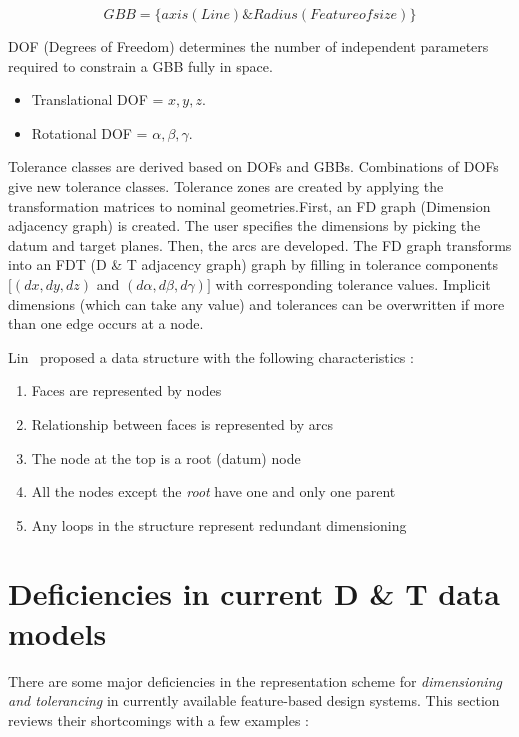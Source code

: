 			\begin{displaymath}
			GBB = \{ axis(Line) \& Radius(Feature of size) \}
			\end{displaymath}
 
    DOF (Degrees of Freedom) determines the number of independent parameters 
	required to constrain a GBB fully in space.
		\begin{itemize} 
		\item
        Translational DOF   = $ x,y,z.$
		\item
        Rotational DOF      = $\alpha,\beta,\gamma.$
		\end{itemize} 
 
    Tolerance classes are derived based on DOFs and GBBs. Combinations of DOFs 
	give new tolerance classes. Tolerance zones are created by applying the 
	transformation matrices to nominal geometries.First, an FD graph (Dimension 
	adjacency graph) is created. The user specifies the dimensions by picking 
	the datum and target planes.
    Then, the arcs are developed. The FD graph transforms into an FDT (D \& T 
	adjacency graph) graph by filling in tolerance components $ [(dx,dy,dz) $ 
	and $ (d\alpha,d\beta,d\gamma) ]$ 
	with corresponding tolerance values. Implicit dimensions (which can take 
	any value) and tolerances can be overwritten if more than one edge occurs at
	a node.
 
    Lin~\cite{Lin} proposed a data structure with the following 
	characteristics :
 
	\begin{enumerate}
	\item
    Faces are represented by nodes
	\item
    Relationship between faces is represented by arcs
	\item
    The node at the top is a root (datum) node
	\item
    All the nodes except the {\em root} have one and only one parent
	\item
    Any loops in the structure represent redundant dimensioning
	\end{enumerate}

	\section{Deficiencies in current D \& T data models} \label{dtdiff}

	There are some major deficiencies in the representation scheme for 
	{\em dimensioning and tolerancing} in currently available feature-based 
	design systems. This section reviews their shortcomings with a few 
	examples :



